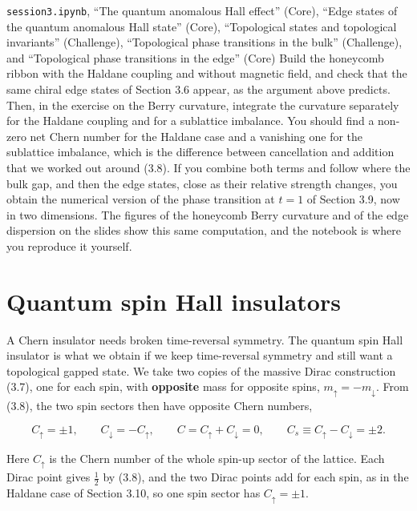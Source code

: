 \begin{notebookbox}{\texttt{session3.ipynb}, ``The quantum anomalous Hall effect'' (Core), ``Edge states of the quantum anomalous Hall state'' (Core), ``Topological states and topological invariants'' (Challenge), ``Topological phase transitions in the bulk'' (Challenge), and ``Topological phase transitions in the edge'' (Core)}
Build the honeycomb ribbon with the Haldane coupling and without magnetic field, and check that the
same chiral edge states of Section 3.6 appear, as the argument above predicts. Then, in the exercise
on the Berry curvature, integrate the curvature separately for the Haldane coupling and for a
sublattice imbalance. You should find a non-zero net Chern number for the Haldane case and a vanishing
one for the sublattice imbalance, which is the difference between cancellation and addition that we
worked out around (3.8). If you combine both terms and follow where the bulk gap, and then the edge
states, close as their relative strength changes, you obtain the numerical version of the phase
transition at $t=1$ of Section 3.9, now in two dimensions. The figures of the honeycomb Berry
curvature and of the edge dispersion on the slides show this same computation, and the notebook is
where you reproduce it yourself.
\end{notebookbox}

\section{Quantum spin Hall insulators}

A Chern insulator needs broken time-reversal symmetry. The quantum spin Hall insulator is what we
obtain if we keep time-reversal symmetry and still want a topological gapped state. We take two
copies of the massive Dirac construction (3.7), one for each spin, with \textbf{opposite} mass for
opposite spins, $m_\uparrow = -m_\downarrow$. From (3.8), the two spin sectors then have opposite
Chern numbers,

\begin{equation}
C_\uparrow = \pm 1, \qquad
C_\downarrow = -C_\uparrow, \qquad
C = C_\uparrow + C_\downarrow = 0, \qquad
C_s \equiv C_\uparrow - C_\downarrow = \pm 2.
\end{equation}

Here $C_\uparrow$ is the Chern number of the whole spin-up sector of the lattice. Each Dirac
point gives $\tfrac12$ by (3.8), and the two Dirac points add for each spin, as in the Haldane case of
Section 3.10, so one spin sector has $C_\uparrow=\pm1$.

